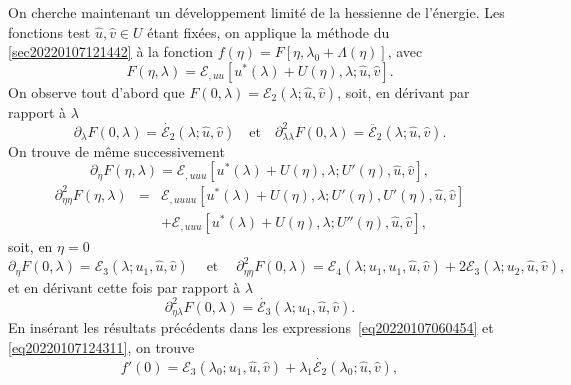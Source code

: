 \documentclass{article}
\newcommand{\nocomma}{}
\newcommand{\tmop}[1]{\ensuremath{\operatorname{#1}}}
\begin{document}
On cherche maintenant un d{\'e}veloppement limit{\'e} de la hessienne de
l'{\'e}nergie. Les fonctions test $\hat{u}, \hat{v} \in U$ {\'e}tant
fix{\'e}es, on applique la m{\'e}thode du
{\textsection}\ref{sec20220107121442} {\`a} la fonction $f (\eta) = F [\eta,
\lambda_0 + \Lambda (\eta)]$, avec
\begin{equation}
  F (\eta, \lambda) =\mathcal{E}_{, u \nocomma u} [u^{\ast} (\lambda) + U
  (\eta), \lambda ; \hat{u}, \hat{v}] .
\end{equation}
On observe tout d'abord que $F (0, \lambda) =\mathcal{E}_2 (\lambda ; \hat{u},
\hat{v})$, soit, en d{\'e}rivant par rapport {\`a} $\lambda$
\begin{equation}
  \partial_{\lambda} F (0, \lambda) = \dot{\mathcal{E}_2} (\lambda ; \hat{u},
  \hat{v}) \quad \text{et} \quad \partial_{\lambda \nocomma \lambda}^2 F (0,
  \lambda) = \ddot{\mathcal{E}_2} (\lambda ; \hat{u}, \hat{v}) .
\end{equation}
On trouve de m{\^e}me successivement
\begin{equation}
  \partial_{\eta} F (\eta, \lambda) =\mathcal{E}_{, u \nocomma u \nocomma u}
  [u^{\ast} (\lambda) + U (\eta), \lambda ; U' (\eta), \hat{u}, \hat{v}],
\end{equation}
\begin{eqnarray}
  \partial_{\eta \nocomma \eta}^2 F (\eta, \lambda) & = & \mathcal{E}_{, u
  \nocomma u \nocomma u \nocomma u} [u^{\ast} (\lambda) + U (\eta), \lambda ;
  U' (\eta), U' (\eta), \hat{u}, \hat{v}] \nonumber\\
  &  & +\mathcal{E}_{, u \nocomma u \nocomma u} [u^{\ast} (\lambda) + U
  (\eta), \lambda ; U'' (\eta), \hat{u}, \hat{v}], 
\end{eqnarray}
soit, en $\eta = 0$
\begin{equation}
  \partial_{\eta} F (0, \lambda) =\mathcal{E}_3 (\lambda ; u_1, \hat{u},
  \hat{v}) \quad \tmop{et} \quad \partial_{\eta \nocomma \eta}^2 F (0,
  \lambda) =\mathcal{E}_4 (\lambda ; u_1, u_1, \hat{u}, \hat{v}) +
  2\mathcal{E}_3 (\lambda ; u_2, \hat{u}, \hat{v}),
\end{equation}
et en d{\'e}rivant cette fois par rapport {\`a} $\lambda$
\begin{equation}
  \partial_{\eta \nocomma \lambda}^2 F (0, \lambda) = \dot{\mathcal{E}_3}
  (\lambda ; u_1, \hat{u}, \hat{v}) .
\end{equation}
En ins{\'e}rant les r{\'e}sultats pr{\'e}c{\'e}dents dans les
expressions~\eqref{eq20220107060454} et \eqref{eq20220107124311}, on trouve
\begin{equation}
  f' (0) =\mathcal{E}_3 (\lambda_0 ; u_1, \hat{u}, \hat{v}) + \lambda_1
  \dot{\mathcal{E}_2} (\lambda_0 ; \hat{u}, \hat{v}),
\end{equation}
\end{document}
